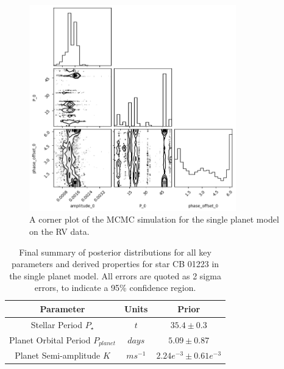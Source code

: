 \begin{figure}[htb]
    \centering
    \includegraphics[width=0.8\textwidth]{figures/1planet_model_corner_plot}
    \caption{A corner plot of the MCMC simulation for the single planet model on the RV data.}
    \label{fig:1planet_model_corner_plot}
\end{figure}

\begin{table}[htb]
    \centering
    \begin{tabular}{ccc}
        \toprule
        \toprule
        Parameter & Units & Prior \\
        \midrule
        Stellar Period $P_{\star}$ & $t$ & $35.4 \pm 0.3$ \\
        \addlinespace
        Planet Orbital Period $P_{planet}$ & $days$ & $5.09 \pm 0.87$  \\
        \addlinespace
        Planet Semi-amplitude $K$ & $ms^{-1}$ & $2.24e^{-3} \pm 0.61e^{-3}$ \\
        \bottomrule
    \end{tabular}
    \caption{Final summary of posterior distributions for all key parameters and derived properties for star CB 01223
    in the single planet model. All errors are quoted as 2 sigma errors, to indicate a 95\% confidence region.}
    \label{tab:final_posteriors}
\end{table}
